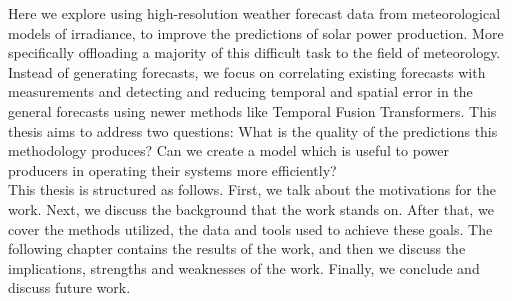 Here we explore using high-resolution weather forecast data from meteorological models of irradiance, to improve the predictions  of solar power production. More specifically offloading a majority of this difficult task to the field of meteorology. Instead of generating forecasts, we focus on correlating existing forecasts with measurements and detecting and reducing temporal and spatial error in the general forecasts using newer methods like Temporal Fusion Transformers.
This thesis aims to address two questions: What is the quality of the predictions this methodology produces? Can we create a model which is useful to power producers in operating their systems more efficiently?\\


This thesis is structured as follows. First, we talk about the motivations for the work. Next, we discuss the background that the work stands on. After that, we cover the methods utilized, the data and tools used to achieve these goals. The following chapter contains the results of the work, and then we discuss the implications, strengths and weaknesses of the work. Finally, we conclude and discuss future work.







